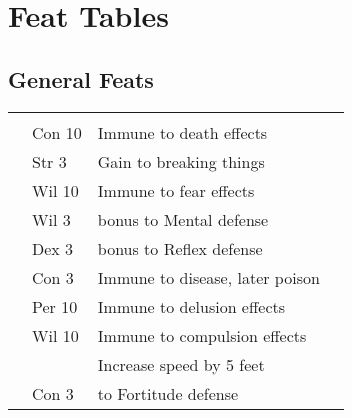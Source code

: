 \section{Feat Tables}
\onecolumn

\subsection{General Feats}
\begin{longtabuwrapper}
    \begin{longtabu}{>{\lcol}p{10em} >{\lcol}p{15em} >{\lcol}X >{\lcol}p{3em}}
         &  &  &  \\
         & Con 10 & Immune to death effects &  \\
         & Str 3 & Gain  to breaking things &  \\
         & Wil 10 & Immune to fear effects &  \\
         & Wil 3 &  bonus to Mental defense &  \\
         & Dex 3 &   bonus to Reflex defense &  \\
         & Con 3 & Immune to disease, later poison &  \\
         & Per 10 & Immune to delusion effects &  \\
         & Wil 10 & Immune to compulsion effects &  \\
         & \x & Increase speed by 5 feet &  \\
         & Con 3 &  to Fortitude defense &  \\


\end{longtabu}
\end{longtabuwrapper}
